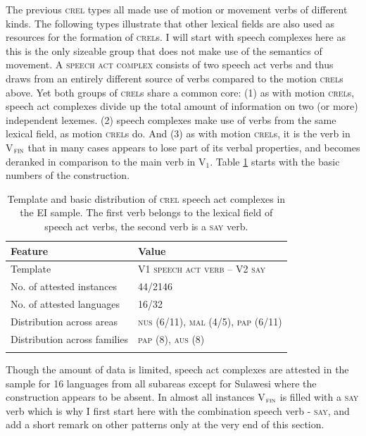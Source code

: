 The previous \textsc{crel} types all made use of motion or movement verbs of different kinds. The following types  illustrate that other lexical fields are also used as resources for the formation of \textsc{crel}s. I will start with speech complexes here as this is the only sizeable group that does not make use of the semantics of movement. A \textsc{speech act complex} consists of two speech act verbs and thus draws from an entirely different source of verbs compared to the motion \textsc{crel}s above. Yet both groups of \textsc{crel}s share a common core: (1) as with motion \textsc{crel}s, speech act complexes divide up the total amount of information on two (or more) independent lexemes. (2) speech complexes make use of verbs from the same lexical field, as motion \textsc{crel}s do. And (3) as with motion \textsc{crel}s, it is the verb in V$_{\textsc{fin}}$ that in many cases appears to lose part of its verbal properties, and becomes deranked in comparison to the main verb in V$_{1}$. Table \ref{table:basiccrelspeech} starts with the basic numbers of the construction.

\begin{table}
\begin{tabular}{ll}
\lsptoprule
Feature&Value\tabularnewline
\hline
Template&V1 \textsc{speech act verb} -- V2 \textsc{\textsc{say}}\tabularnewline
No. of attested instances& 44/2146 \tabularnewline
No. of attested languages& 16/32 \tabularnewline
Distribution across areas& \textsc{nus} (6/11), \textsc{mal} (4/5), \textsc{pap} (6/11) \tabularnewline
Distribution across families& \textsc{pap} (8), \textsc{aus} (8) \tabularnewline
\lspbottomrule
\end{tabular}
\caption[Template and basic distribution of \textsc{crel} speech act complexes]{Template and basic distribution of \textsc{crel} speech act complexes in the EI sample. The first verb belongs to the lexical field of speech act verbs, the second verb is a \textsc{say} verb.}
\label{table:basiccrelspeech}
\end{table}

Though the amount of data is limited, speech act complexes are attested in the sample for 16 languages from all subareas except for Sulawesi where the construction appears to be absent. In almost all instances V$_{\textsc{fin}}$ is filled with a \textsc{say} verb which is why I first start here with the combination speech verb - \textsc{say}, and add a short remark on other patterns only at the very end of this section. 

